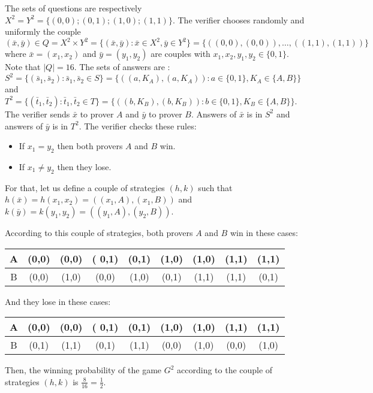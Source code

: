 The sets of questions are respectively $X^2=Y^2=\{(0,0);(0,1);(1,0);(1,1)\}.$ The verifier chooses randomly and uniformly the couple $(\bar{x}, \bar{y}) \in Q=X^2 \times Y^2=\{(\bar{x}, \bar{y}): \bar{x} \in X^2, \bar{y} \in Y^2 \}=\{((0,0),(0,0)), \ldots,  ((1,1),(1,1))\}$ where $\bar{x}=(x_1,x_2)$ and $ \bar{y}=(y_1,y_2)$ are couples with $x_1, x_2, y_1, y_2 \in \{0,1\}$. Note that $|Q|=16.$ The sets of answers are :$S^2=\{(\bar{s}_1, \bar{s}_2): \bar{s}_1, \bar{s}_2 \in S\}=   \{((a,K_A), (a,K_A)): a \in \{0,1\}, K_A \in \{A,B\} \}$ and $T^2=\{(\bar{t}_1, \bar{t}_2): \bar{t}_1, \bar{t}_2 \in T\}= \{((b,K_B), (b,K_B)): b \in \{0,1\}, K_B \in \{A,B\} \}$. The verifier sends $\bar{x}$ to prover $A$ and $\bar{y}$ to prover $B$. Answers of $\bar{x}$ is in $S^2$ and answers of $\bar{y}$ is in $T^2$. The verifier checks these rules:
\begin{itemize}
\item If $x_1=y_2$ then both provers $A$ and $B$ win.
\item If $x_1 \neq y_2$ then they lose.
\end{itemize}

For that, let us define a couple of strategies $(h,k)$ such that $h(\bar{x})=h(x_1,x_2)=((x_1,A),(x_1,B))$ and $k(\bar{y})=k(y_1,y_2)=((y_1,A),(y_2,B))$.

According to this couple of strategies, both provers $A$ and $B$ win in these cases:

\begin{table}[h]
\centering
\begin{tabular}{c|cccccccc} 
A & (0,0) & (0,0) &( 0,1) & (0,1) & (1,0) & (1,0) & (1,1) & (1,1) \\ 
\hline 
B & (0,0) & (1,0) & (0,0) & (1,0) & (0,1) & (1,1) & (1,1) & (0,1) 
\end{tabular} 
\end{table}

And they lose in these cases:

\begin{table}[h]
\centering
\begin{tabular}{c|cccccccc} 
A & (0,0) & (0,0) &( 0,1) & (0,1) & (1,0) & (1,0) & (1,1) & (1,1) \\ 
\hline 
B & (0,1) & (1,1) & (0,1) & (1,1) & (0,0) & (1,0) & (0,0) & (1,0) 
\end{tabular}
\end{table} 

Then, the winning probability of the game $G^2$ according to the couple of strategies $(h,k)$ is $\frac{8}{16}=\frac{1}{2}.$

